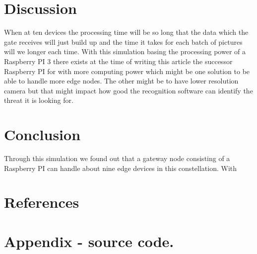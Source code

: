 \documentclass[a4paper,11pt,notitlepage,twocolumn]{article}
\begin{document}
  \section{Discussion}
    When at ten devices the processing time will be so long that the data which the gate receives
    will just build up and the time it takes for each batch of pictures will we longer each time.
    With this simulation basing the processing power of a Raspberry PI 3 there exists at the time
    of writing this article the successor Raspberry PI for with more computing power which
    might be one solution to be able to handle more edge nodes. The other might be to have lower
    resolution camera but that might impact how good the recognition software can identify
    the threat it is looking for.
    
  \section{Conclusion}
    Through this simulation we found out that a gateway node consisting of a Raspberry PI can
    handle about nine edge devices in this constellation. With 
    
  \section{References}
    

  \onecolumn
  \section{Appendix - source code.}
\end{document}
